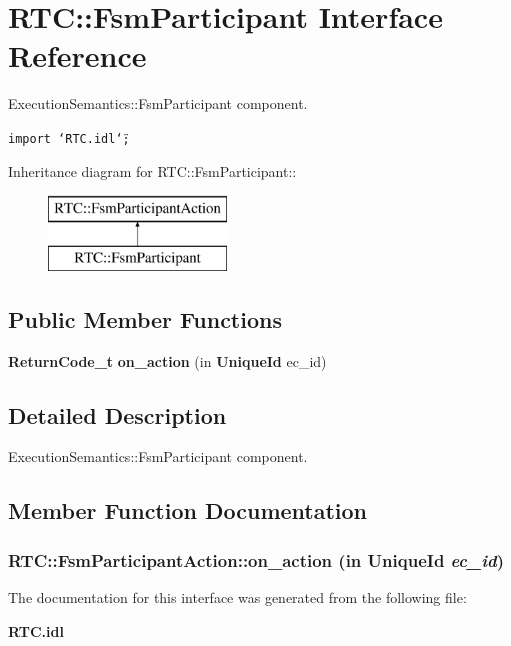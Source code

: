 \section{RTC::Fsm\-Participant Interface Reference}
\label{interfaceRTC_1_1FsmParticipant}
Execution\-Semantics::Fsm\-Participant component.  


{\tt import \char`\"{}RTC.idl\char`\"{};}

Inheritance diagram for RTC::Fsm\-Participant::\begin{figure}[H]
\begin{center}
\leavevmode
\includegraphics[height=2cm]{interfaceRTC_1_1FsmParticipant}
\end{center}
\end{figure}
\subsection*{Public Member Functions}
\begin{CompactItemize}
\item 
{\bf Return\-Code\_\-t} {\bf on\_\-action} (in {\bf Unique\-Id} ec\_\-id)
\end{CompactItemize}


\subsection{Detailed Description}
Execution\-Semantics::Fsm\-Participant component. 



\subsection{Member Function Documentation}
\subsubsection{ RTC::Fsm\-Participant\-Action::on\_\-action (in {\bf Unique\-Id} {\em ec\_\-id})\hspace{0.3cm}{\tt  [inherited]}}\label{interfaceRTC_1_1FsmParticipantAction_RTC_1_1FsmParticipantActiona0}




The documentation for this interface was generated from the following file:\begin{CompactItemize}
\item 
{\bf RTC.idl}\end{CompactItemize}
